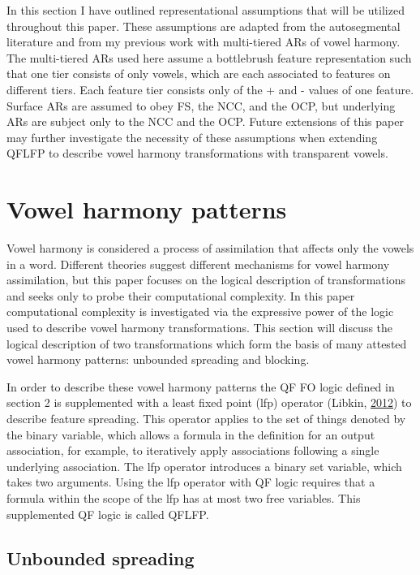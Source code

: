 \documentclass[,doc,floatsintext]{apa6}
\theoremstyle{definition}
\theoremstyle{definition}
\theoremstyle{definition}
\theoremstyle{remark}
\begin{document}
In this section I have outlined representational assumptions that will
be utilized throughout this paper. These assumptions are adapted from
the autosegmental literature and from my previous work with multi-tiered
ARs of vowel harmony. The multi-tiered ARs used here assume a
bottlebrush feature representation such that one tier consists of only
vowels, which are each associated to features on different tiers. Each
feature tier consists only of the + and - values of one feature. Surface
ARs are assumed to obey FS, the NCC, and the OCP, but underlying ARs are
subject only to the NCC and the OCP. Future extensions of this paper may
further investigate the necessity of these assumptions when extending
QFLFP to describe vowel harmony transformations with transparent vowels.

\section{Vowel harmony patterns}\label{vowel-harmony-patterns}

Vowel harmony is considered a process of assimilation that affects only
the vowels in a word. Different theories suggest different mechanisms
for vowel harmony assimilation, but this paper focuses on the logical
description of transformations and seeks only to probe their
computational complexity. In this paper computational complexity is
investigated via the expressive power of the logic used to describe
vowel harmony transformations. This section will discuss the logical
description of two transformations which form the basis of many attested
vowel harmony patterns: unbounded spreading and blocking.

In order to describe these vowel harmony patterns the QF FO logic
defined in section 2 is supplemented with a least fixed point (lfp)
operator (Libkin, \protect\hyperlink{ref-libkin2012}{2012}) to describe
feature spreading. This operator applies to the set of things denoted by
the binary variable, which allows a formula in the definition for an
output association, for example, to iteratively apply associations
following a single underlying association. The lfp operator introduces a
binary set variable, which takes two arguments. Using the lfp operator
with QF logic requires that a formula within the scope of the lfp has at
most two free variables. This supplemented QF logic is called QFLFP.

\subsection{Unbounded spreading}\label{unbounded-spreading}
\end{document}
